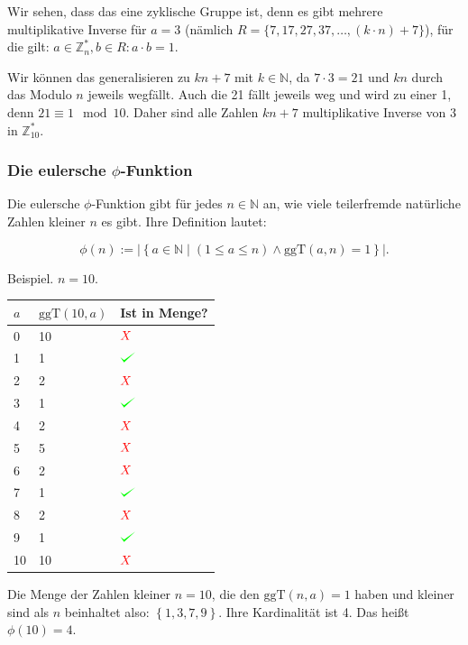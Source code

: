 \documentclass{scrartcl}
\newcommand{\ggt}[1]{\ensuremath{\textrm{ggT}\left(#1\right)}}
\def\checkmark{\tikz\fill[scale=0.4](0,.35) -- (.25,0) -- (1,.7) -- (.25,.15) -- cycle;}
\newcommand{\cmark}{\textcolor{green}{\checkmark}}
\newcommand{\xmark}{\textcolor{red}{X}}
\begin{document}
Wir sehen, dass das eine zyklische Gruppe ist, denn es gibt mehrere multiplikative Inverse für $a = 3$ (nämlich $R = \{7, 17, 27, 37, \dots, (k\cdot n) + 7\}$),
für die gilt: $a \in \mathbb{Z}_n^*, b \in R: a \cdot b = 1$.

Wir können das generalisieren zu $kn + 7$ mit $k \in \mathbb{N}$, da $7 \cdot 3 = 21$ und $kn$ durch das Modulo $n$ jeweils \frq wegfällt\flq.
Auch die 21 fällt jeweils weg und wird zu einer 1, denn $21 \equiv 1 \mod 10$. Daher sind alle Zahlen $kn + 7$ multiplikative Inverse von
$3$ in $\mathbb{Z}_{10}^*$.

\subsubsection{Die eulersche $\phi$-Funktion}

\label{eulerphi}

Die eulersche $\phi$-Funktion gibt für jedes $n \in \mathbb{N}$ an, wie viele teilerfremde natürliche Zahlen kleiner $n$
es gibt. Ihre Definition lautet:

\begin{equation}
	\phi(n) := \left|\left\{
		a \in \mathbb{N} \middle| \left(1 \leq a \leq n\right) \wedge
		\ggt{a, n} = 1
	\right\}\right|.
\end{equation}

Beispiel. $n = 10$.

\begin{tabular}{|l|l|l|}
	\hline
	$a$ & $\ggt{10, a}$ & Ist in Menge?\\\hline
	0 & 10 & $\xmark$ \\
	1 & 1 & $\cmark$ \\
	2 & 2 & $\xmark$ \\
	3 & 1 & $\cmark$ \\
	4 & 2 & $\xmark$ \\
	5 & 5 & $\xmark$ \\
	6 & 2 & $\xmark$ \\
	7 & 1 & $\cmark$ \\
	8 & 2 & $\xmark$ \\
	9 & 1 & $\cmark$ \\
	10 & 10 & $\xmark$ \\\hline
\end{tabular}

Die Menge der Zahlen kleiner $n = 10$, die den 
$\ggt{n, a} = 1$ haben und kleiner
sind als $n$ beinhaltet also: $\left\{1, 3, 7, 9\right\}$.
Ihre Kardinalität ist 4. Das heißt $\phi(10) = 4$.
\end{document}
